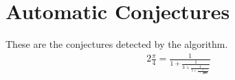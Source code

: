 \documentclass{article}%
\begin{document}
%
\normalsize%
\section{Automatic Conjectures}%
\label{sec:Automatic Conjectures}%
These are the conjectures detected by the algorithm.%
\begin{alignat*}{2}%
\frac{ \pi }{ 4 } = \frac{1}{ 1 + \frac{ 1 } { 3 + \frac{ 4 } { 5 + \frac{ 9 } { 7 + \frac{ 16 } { 9 + \dots } } } } }%
\end{alignat*}

%
\end{document}
